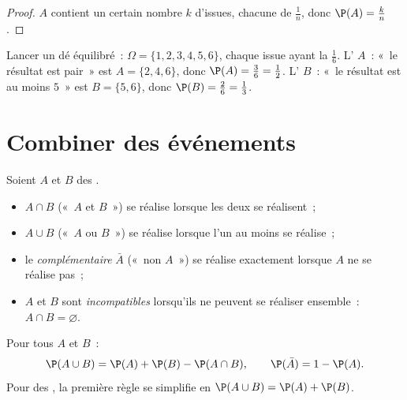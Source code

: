 \begin{proof}
$A$ contient un certain nombre $k$ d'issues, chacune de 
$\frac1n$, donc $\P(A) = \frac kn$.
\end{proof}

\begin{example}\label{ex:g10:proba:die}
Lancer un dé équilibré~: $\Omega = \{1, 2, 3, 4, 5, 6\}$, chaque issue
ayant la  $\frac16$. L' $A$~: «~le résultat est
pair~» est $A = \{2, 4, 6\}$, donc $\P(A) = \frac36 = \frac12$.
L' $B$~: «~le résultat est au moins $5$~» est $B = \{5, 6\}$,
donc $\P(B) = \frac26 = \frac13$.
\end{example}

\section{Combiner des événements}

\begin{definition}\label{def:g10:proba:operations}
Soient $A$ et $B$ des .
\begin{itemize}
  \item $A \cap B$ («~$A$ et $B$~») se réalise lorsque les deux se
        réalisent~;
  \item $A \cup B$ («~$A$ ou $B$~») se réalise lorsque l'un au moins se
        réalise~;
  \item le \emph{complémentaire} $\bar A$
        («~non $A$~») se réalise exactement lorsque $A$ ne se réalise
        pas~;
  \item $A$ et $B$ sont \emph{incompatibles} lorsqu'ils ne peuvent se
        réaliser ensemble~: $A \cap B = \varnothing$.
\end{itemize}
\end{definition}

\begin{theorem}\label{thm:g10:proba:addition}
Pour tous  $A$ et $B$~:
\[
\P(A \cup B) = \P(A) + \P(B) - \P(A \cap B),
\qquad
\P(\bar A) = 1 - \P(A) .
\]
Pour des  , la première règle se simplifie en
$\P(A \cup B) = \P(A) + \P(B)$.
\end{theorem}

